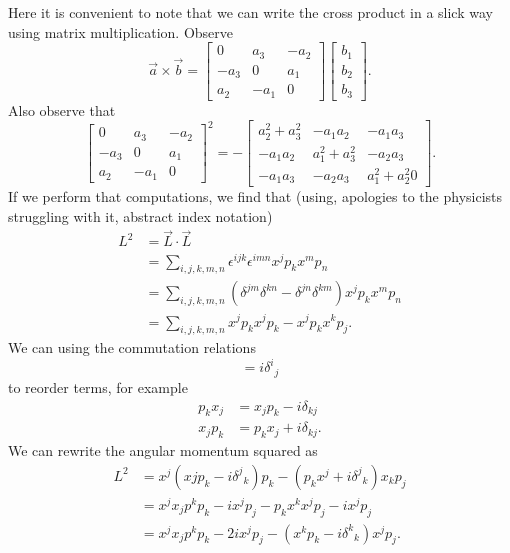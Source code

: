 Here it is convenient to note that we can write the cross product
in a slick way using matrix multiplication. Observe
\begin{equation}
\vec{a}\times\vec{b} = \begin{bmatrix}0 & a_3 & -a_2\\
-a_3 & 0 & a_1\\
a_2 & -a_1 &
0\end{bmatrix}\begin{bmatrix}b_1\\b_2\\b_3\end{bmatrix}.
\end{equation}
Also observe that
\begin{equation}
\begin{bmatrix}0 & a_3 & -a_2\\
-a_3 & 0 & a_1\\
a_2 & -a_1 &
0\end{bmatrix}^2 = - \begin{bmatrix} a_{2}^{2}+a_{3}^{2} & -a_1a_2 & -a_1a_3\\
-a_1a_2 & a_{1}^{2}+a_{3}^{2} & -a_{2}a_{3}\\
-a_{1}a_{3} & -a_{2}a_{3} & a_{1}^{2}+a_{2}^{2}
0\end{bmatrix}.
\end{equation}
If we perform that computations, we find that (using, apologies
to the physicists struggling with it, abstract index notation)
\begin{subequations}
\begin{align}
L^{2} &= \vec{L}\cdot\vec{L}\\
&=
\sum_{i,j,k,m,n}\epsilon^{ijk}\epsilon^{imn}x^{j}p_{k}x^{m}p_{n}\\
&= \sum_{i,j,k,m,n}(\delta^{jm}\delta^{kn}-\delta^{jn}\delta^{km})x^{j}p_{k}x^{m}p_{n}\\
&= \sum_{i,j,k,m,n}x^{j}p_{k}x^{j}p_{k} - x^{j}p_{k}x^{k}p_{j}.
\end{align}
\end{subequations}
We can using the commutation relations
\begin{equation}
[\widehat{x}^{i},\widehat{p}_{j}]=i{\delta^{i}}_{j}
\end{equation}
to reorder terms, for example
\begin{subequations}
\begin{align}
p_{k}x_{j} &= x_{j}p_{k}-i\delta_{kj}\\
x_{j}p_{k} &= p_{k}x_{j}+i\delta_{kj}.
\end{align}
\end{subequations}
We can rewrite the angular momentum squared as
\begin{subequations}
\begin{align}
L^2 &= x^{j}(x{j}p_{k} -
i{\delta^{j}}_{k})p_{k}-(p_{k}x^{j}+i{\delta^{j}}_{k})x_{k}p_{j}\\
&=
x^{j}x_{j}p^{k}p_{k}-ix^{j}p_{j}-p_{k}x^{k}x^{j}p_{j}-ix^{j}p_{j}\\\
&=x^{j}x_{j}p^{k}p_{k}-2ix^{j}p_{j}-(x^{k}p_{k}-i{\delta^{k}}_{k})x^{j}p_{j}.
\end{align}
\end{subequations}

